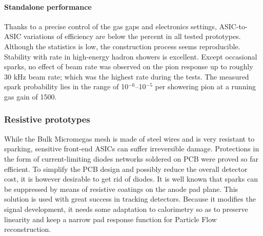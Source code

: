 \paragraph{Standalone performance}
Thanks to a precise control of the gas gaps and electronics settings, ASIC-to-ASIC variations of efficiency are below the percent in all tested prototypes. Although the statistics is low, the construction process seems reproducible. Stability with rate in high-energy hadron showers is excellent. Except occasional sparks, no effect of beam rate was observed on the pion response up to roughly 30 kHz beam rate; which was the highest rate during the tests. The measured spark probability lies in the range of 10$^{-6}$--10$^{-5}$ per showering pion at a running gas gain of 1500.

\subsubsection{Resistive prototypes}

While the Bulk Micromegas mesh is made of steel wires and is very resistant to sparking, sensitive front-end ASICs can suffer irreversible damage. Protections in the form of current-limiting diodes networks soldered on PCB were proved so far efficient. To simplify the PCB design and possibly reduce the overall detector cost, it is however desirable to get rid of diodes. It is well known that sparks can be suppressed by means of resistive coatings on the anode pad plane. This solution is used with great success in tracking detectors. Because it modifies the signal development, it needs some adaptation to calorimetry so as to preserve linearity and keep a narrow pad response function for Particle Flow reconstruction.


